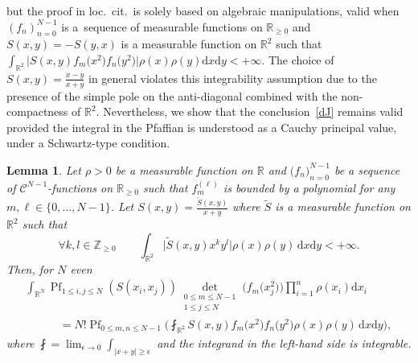\documentclass[pdftex]{sigma}
\numberwithin{equation}{section}
\newcommand{\dd}{\mathrm{d}}
\newtheorem{Lemma}[Theorem]{Lemma}
\begin{document}
but the proof in loc.\ cit.\ is solely based on algebraic manipulations, valid when $(f_n)_{n = 0}^{N - 1}$ is a~sequence of measurable functions on $\mathbb{R}_{\geq 0}$ and $S(x,y) = -S(y,x)$ is a measurable function on $\mathbb{R}^2$ such that $\int_{\mathbb{R}^2} \big|S(x,y)f_m\bigl(x^2\bigr)f_n\bigl(y^2\bigr)\big|\rho(x)\rho(y)\dd x\dd y < +\infty$. The choice of $S(x,y) = \frac{x - y}{x + y}$ in general violates this integrability assumption due to the presence of the simple pole on the anti-diagonal combined with the non-compactness of $\mathbb{R}^2$. Nevertheless, we show that the conclusion~\eqref{dJ} remains valid provided the integral in the Pfaffian is understood as a Cauchy principal value, under a Schwartz-type condition.

\begin{Lemma}
\label{HUHH}Let $\rho > 0$ be a measurable function on $\mathbb{R}$ and $\mathbb(f_n)_{n = 0}^{N - 1}$ be a sequence of $\mathcal{C}^{N - 1}$-functions on $\mathbb{R}_{\geq 0}$ such that $f^{(\ell)}_m$ is bounded by a polynomial for any $m,\ell \in \{0,\dots,N - 1\}$. Let $S(x,y) = \frac{\tilde{S}(x,y)}{x + y}$ where $\tilde{S}$ is a measurable function on $\mathbb{R}^2$ such that
\[
\forall k,l \in \mathbb{Z}_{\geq 0}\qquad \int_{\mathbb{R}^2} \bigl|\tilde{S}(x,y)x^ky^l\bigr|\rho(x)\rho(y)\,\dd x \dd y < +\infty.
\]
Then, for $N$ even
\begin{gather*}
 \int_{\mathbb{R}^N} \operatorname{Pf}_{1 \leq i,j \leq N} (S(x_i,x_j)) \mathop{\det}_{\substack{0 \leq m \leq N - 1 \\
 1 \leq j \leq N}} \bigl(f_m\bigl(x_j^2\bigr)\bigr) \prod_{i = 1}^n \rho(x_i)\dd x_i \\
\qquad\quad{} = N!\operatorname{Pf}_{0 \leq m,n \leq N - 1}\biggl(\fint_{\mathbb{R}^2} S(x,y) f_m\bigl(x^2\bigr) f_n\bigl(y^2\bigr)\rho(x)\rho(y)\,\dd x \dd y\biggr),
\end{gather*}
where $\fint = \lim_{\epsilon \rightarrow 0} \int_{|x + y| \geq \epsilon}$ and the integrand in the left-hand side is integrable.
\end{Lemma}
\end{document}
